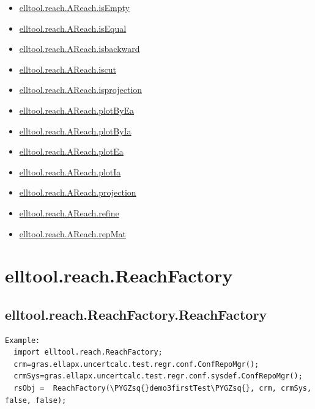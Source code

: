 \documentclass[letterpaper,10pt,english]{sphinxmanual}
\def\PYGZsq{\char`\'}
\begin{document}
\begin{itemize}
\item {} 
{\hyperref[chap_functions:elltool-reach-areach-isempty]{elltool.reach.AReach.isEmpty}}

\item {} 
{\hyperref[chap_functions:elltool-reach-areach-isequal]{elltool.reach.AReach.isEqual}}

\item {} 
{\hyperref[chap_functions:elltool-reach-areach-isbackward]{elltool.reach.AReach.isbackward}}

\item {} 
{\hyperref[chap_functions:elltool-reach-areach-iscut]{elltool.reach.AReach.iscut}}

\item {} 
{\hyperref[chap_functions:elltool-reach-areach-isprojection]{elltool.reach.AReach.isprojection}}

\item {} 
{\hyperref[chap_functions:elltool-reach-areach-plotbyea]{elltool.reach.AReach.plotByEa}}

\item {} 
{\hyperref[chap_functions:elltool-reach-areach-plotbyia]{elltool.reach.AReach.plotByIa}}

\item {} 
{\hyperref[chap_functions:elltool-reach-areach-plotea]{elltool.reach.AReach.plotEa}}

\item {} 
{\hyperref[chap_functions:elltool-reach-areach-plotia]{elltool.reach.AReach.plotIa}}

\item {} 
{\hyperref[chap_functions:elltool-reach-areach-projection]{elltool.reach.AReach.projection}}

\item {} 
{\hyperref[chap_functions:elltool-reach-areach-refine]{elltool.reach.AReach.refine}}

\item {} 
{\hyperref[chap_functions:elltool-reach-areach-repmat]{elltool.reach.AReach.repMat}}

\end{itemize}


\section{elltool.reach.ReachFactory}
\label{chap_functions:elltool-reach-reachfactory}

\subsection{elltool.reach.ReachFactory.ReachFactory}
\label{chap_functions:elltool-reach-reachfactory-reachfactory}
\begin{Verbatim}[commandchars=\\\{\}]
Example:
  import elltool.reach.ReachFactory;
  crm=gras.ellapx.uncertcalc.test.regr.conf.ConfRepoMgr();
  crmSys=gras.ellapx.uncertcalc.test.regr.conf.sysdef.ConfRepoMgr();
  rsObj =  ReachFactory(\PYGZsq{}demo3firstTest\PYGZsq{}, crm, crmSys, false, false);
\end{Verbatim}
\end{document}

